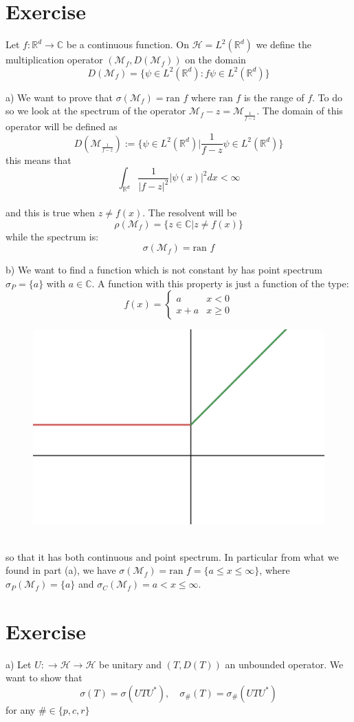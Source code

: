 \documentclass{article}
\newcommand{\R}{\mathbb{R}}
\newcommand{\C}{\mathbb{C}}
\newcommand{\M}{\mathcal{M}}
\begin{document}
\section{Exercise}
Let $f : \R^d \to \C$ be a continuous function. On $\mathcal{H} = L^2(\R^d)$ we define the multiplication operator $( \M_f, D(\M_f) )$ on the domain
\[
    D(\M_f) = \{ \psi \in L^2(\R^d) : f\psi \in L^2(\R^d) \}
\]

a) We want to prove that $\sigma(\M_f) = \mbox{ran }f$ where $\mbox{ran }f$ is the range of $f$. To do so we look at the spectrum of the operator $\M_f - z = \M_{\frac{1}{f-z}}$. The domain of this operator will be defined as 
\[
    D(\M_{\frac{1}{f-z}}) := \{ \psi \in L^2 (\R^d) | \frac{1}{f-z} \psi \in L^2(\R^d) \} 
\]
this means that \\
\[
    \int_{\R^d} \frac{1}{|f-z|^2} |\psi(x)|^2 dx < \infty
\]\\
and this is true when $z \neq f(x)$. The resolvent will be
\[
    \rho(\M_f) = \{ z\in \C | z \neq f(x) \}
\]
while the spectrum is:
\[
    \sigma(\M_f) = \mbox{ran }f
\]

b) We want to find a function which is not constant by has point spectrum $\sigma_P = \{ a \}$ with $a \in \C$. A function with this property is just a function of the type:
\[
    f(x) = \begin{cases}
        a & x<0\\
        x + a & x \geq 0 
    \end{cases}
\]
\begin{figure}[!ht]
    \centering
    \includegraphics[width = 0.5 \textwidth]{TeX/IMG/desmos-graph.png}
\end{figure}\\
so that it has both continuous and point spectrum. In particular from what we found in part (a), we have $\sigma (\M_f) = \mbox{ran }f = \{ a\leq x \leq \infty \}$, where $\sigma_P(\M_f) = \{ a \}$ and $\sigma_C (\M_f) = {a < x \leq \infty}$.
\section{Exercise}
a) Let $U : \to \mathcal{H} \to \mathcal H $ be unitary and $(T, D(T))$ an unbounded operator. We want to show that 
\[
    \sigma(T) = \sigma(UTU^*), \quad \sigma_\#(T) = \sigma_\# (UTU^*)
\]
for any $\# \in \{ p,c,r \}$
\end{document}
